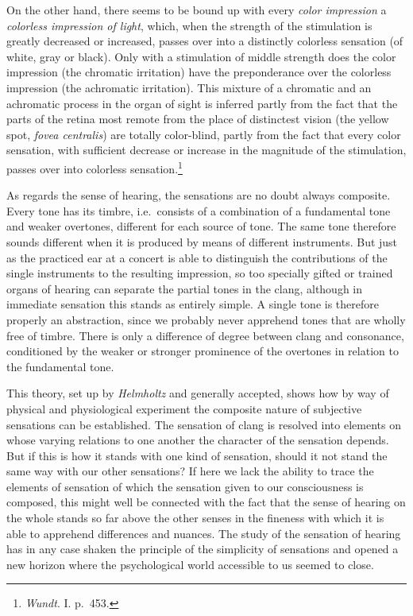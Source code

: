\documentclass[12pt,a4paper]{book}
\newcommand{\opage}[1]{\marginnote{\footnotesize\textit{[#1]}}}
\begin{document}
On the other hand, there seems to be bound up with every \emph{color
impression} a \emph{colorless impression of light}, which, when the
strength of the stimulation is greatly decreased or increased, passes
over into a distinctly colorless sensation (of white, gray or black).
Only with a stimulation of middle strength does the color impression
(the chromatic irritation) have the preponderance over the colorless
impression (the achromatic irritation). This mixture of a chromatic and
an achromatic process in the organ of sight is inferred partly from the
fact that the parts of the retina most remote from the place of
distinctest vision (the yellow spot, \textit{fovea centralis}) are
totally color-blind, partly from the fact that every color sensation,
with
\opage{125}sufficient decrease or increase in the magnitude of the
stimulation, passes over into colorless sensation.\footnote{\emph{Wundt}.
I. p.~453.}

As regards the sense of hearing, the sensations are no doubt always
composite. Every tone has its timbre, i.e.\ consists of a combination of
a fundamental tone and weaker overtones, different for each source of
tone. The same tone therefore sounds different when it is produced by
means of different instruments. But just as the practiced ear at a
concert is able to distinguish the contributions of the single
instruments to the resulting impression, so too specially gifted or
trained organs of hearing can separate the partial tones in the clang,
although in immediate sensation this stands as entirely simple. A single
tone is therefore properly an abstraction, since we probably never
apprehend tones that are wholly free of timbre. There is only a
difference of degree between clang and consonance, conditioned by the
weaker or stronger prominence of the overtones in relation to the
fundamental tone.

This theory, set up by \emph{Helmholtz} and generally accepted, shows
how by way of physical and physiological experiment the composite nature
of subjective sensations can be established. The sensation of clang is
resolved into elements on whose varying relations to one another the
character of the sensation depends. But if this is how it stands with
one kind of sensation, should it not stand the same way with our other
sensations? If here we lack the ability to trace the elements of
sensation of which the sensation given to our consciousness is composed,
this might well be connected with the fact that the sense of hearing on
the whole stands so far above the other senses in the fineness with
which it is able to apprehend differences and nuances. The study of the
sensation of hearing has in any case shaken the principle of the
simplicity of sensations and opened a new horizon where the
psychological world accessible to us seemed to close.
\end{document}
